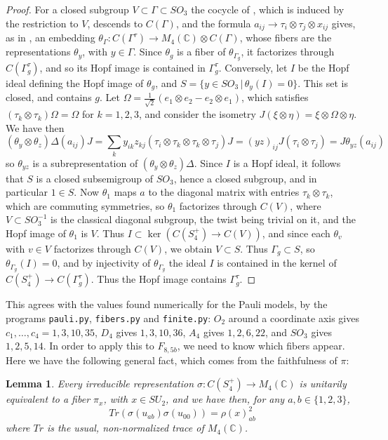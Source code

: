 \documentclass[11pt]{amsart}
\newtheorem{lemma}[theorem]{Lemma}
\begin{document}
\begin{proof}
For a closed subgroup $V\subset\Gamma\subset SO_3$ the cocycle of \cite{bb2}, which is induced by the restriction to $V$, descends to $C(\Gamma)$, and the formula $a_{ij}\to\tau_i\otimes\tau_j\otimes x_{ij}$ gives, as in \cite[Theorem 5.1]{bb2}, an embedding $\theta_\Gamma:C(\Gamma^\tau)\to M_4(\mathbb C)\otimes C(\Gamma)$, whose fibers are the representations $\theta_y$, with $y\in\Gamma$. Since $\theta_g$ is a fiber of $\theta_{\Gamma_g}$, it factorizes through $C(\Gamma_g^\tau)$, and so its Hopf image is contained in $\Gamma_g^\tau$. Conversely, let $I$ be the Hopf ideal defining the Hopf image of $\theta_g$, and $S=\{y\in SO_3\,|\,\theta_y(I)=0\}$. This set is closed, and contains $g$. Let $\Omega=\frac{1}{\sqrt2}(e_1\otimes e_2-e_2\otimes e_1)$, which satisfies $(\tau_k\otimes\tau_k)\Omega=\Omega$ for $k=1,2,3$, and consider the isometry $J(\xi\otimes\eta)=\xi\otimes\Omega\otimes\eta$. We have then
$$(\theta_y\otimes\theta_z)\Delta(a_{ij})J=\sum_ky_{ik}z_{kj}(\tau_i\otimes\tau_k\otimes\tau_k\otimes\tau_j)J=(yz)_{ij}J(\tau_i\otimes\tau_j)=J\theta_{yz}(a_{ij})$$
so $\theta_{yz}$ is a subrepresentation of $(\theta_y\otimes\theta_z)\Delta$. Since $I$ is a Hopf ideal, it follows that $S$ is a closed subsemigroup of $SO_3$, hence a closed subgroup, and in particular $1\in S$. Now $\theta_1$ maps $a$ to the diagonal matrix with entries $\tau_k\otimes\tau_k$, which are commuting symmetries, so $\theta_1$ factorizes through $C(V)$, where $V\subset SO_3^{-1}$ is the classical diagonal subgroup, the twist being trivial on it, and the Hopf image of $\theta_1$ is $V$. Thus $I\subset\ker(C(S_4^+)\to C(V))$, and since each $\theta_v$ with $v\in V$ factorizes through $C(V)$, we obtain $V\subset S$. Thus $\Gamma_g\subset S$, so $\theta_{\Gamma_g}(I)=0$, and by injectivity of $\theta_{\Gamma_g}$ the ideal $I$ is contained in the kernel of $C(S_4^+)\to C(\Gamma_g^\tau)$. Thus the Hopf image contains $\Gamma_g^\tau$.
\end{proof}

\noindent This agrees with the values found numerically for the Pauli models, by the programs \texttt{pauli.py}, \texttt{fibers.py} and \texttt{finite.py}: $O_2$ around a coordinate axis gives $c_1,\ldots,c_4=1,3,10,35$, $D_4$ gives $1,3,10,36$, $A_4$ gives $1,2,6,22$, and $SO_3$ gives $1,2,5,14$. In order to apply this to $F_{8,5b}$, we need to know which fibers appear. Here we have the following general fact, which comes from the faithfulness of $\pi$:

\begin{lemma}\label{lem:fiber}
Every irreducible representation $\sigma:C(S_4^+)\to M_4(\mathbb C)$ is unitarily equivalent to a fiber $\pi_x$, with $x\in SU_2$, and we have then, for any $a,b\in\{1,2,3\}$,
$$Tr(\sigma(u_{ab})\sigma(u_{00}))=\rho(x)_{ab}^2$$
where $Tr$ is the usual, non-normalized trace of $M_4(\mathbb C)$.
\end{lemma}
\end{document}
